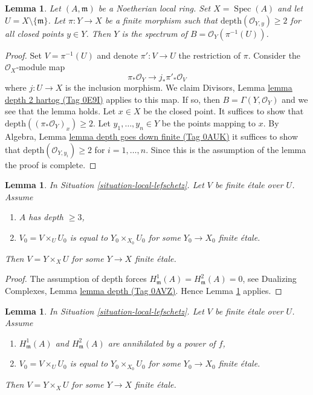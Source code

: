 \documentclass{amsart}
\theoremstyle{plain}
\newtheorem{lemma}[subsection]{Lemma}
\theoremstyle{definition}
\theoremstyle{remark}
\numberwithin{equation}{subsection}
\def\Spec{\mathop{\mathrm{Spec}}}
\begin{document}
\begin{lemma}
\label{lemma-sections-over-punctured-spec}
Let $(A, \mathfrak m)$ be a Noetherian local ring. Set $X = \Spec(A)$
and let $U = X \setminus \{\mathfrak m\}$.
Let $\pi : Y \to X$ be a finite morphism such that
$\text{depth}(\mathcal{O}_{Y, y}) \geq 2$ for all closed points
$y \in Y$.
Then $Y$ is the spectrum of $B = \mathcal{O}_Y(\pi^{-1}(U))$.
\end{lemma}

\begin{proof}
Set $V = \pi^{-1}(U)$ and denote $\pi' : V \to U$ the restriction of $\pi$.
Consider the $\mathcal{O}_X$-module map
$$
\pi_*\mathcal{O}_Y \longrightarrow j_*\pi'_*\mathcal{O}_V
$$
where $j : U \to X$ is the inclusion morphism. We claim
Divisors, Lemma \href{https://stacks.math.columbia.edu/tag/0E9I}{lemma depth 2 hartog (Tag 0E9I)}
applies to this map. If so, then $B = \Gamma(Y, \mathcal{O}_Y)$
and we see that the lemma holds. Let $x \in X$ be the closed point.
It suffices to show that
$\text{depth}((\pi_*\mathcal{O}_Y)_x) \geq 2$.
Let $y_1, \ldots, y_n \in Y$ be the points mapping to $x$.
By Algebra, Lemma \href{https://stacks.math.columbia.edu/tag/0AUK}{lemma depth goes down finite (Tag 0AUK)}
it suffices to show that
$\text{depth}(\mathcal{O}_{Y, y_i}) \geq 2$ for $i = 1, \ldots, n$.
Since this is the assumption of the lemma the proof is complete.
\end{proof}


\begin{lemma}
\label{lemma-lift-purity}
In Situation \ref{situation-local-lefschetz}.
Let $V$ be finite \'etale over $U$. Assume
\begin{enumerate}
\item $A$ has depth $\geq 3$,
\item $V_0 = V \times_U U_0$ is equal to $Y_0 \times_{X_0} U_0$
for some $Y_0 \to X_0$ finite \'etale.
\end{enumerate}
Then $V = Y \times_X U$ for some $Y \to X$ finite \'etale.
\end{lemma}

\begin{proof}
The assumption of depth forces
$H^1_\mathfrak m(A) = H^2_\mathfrak m(A) = 0$, see
Dualizing Complexes, Lemma \href{https://stacks.math.columbia.edu/tag/0AVZ}{lemma depth (Tag 0AVZ)}.
Hence Lemma \ref{lemma-lift-purity-general} applies.
\end{proof}


\begin{lemma}
\label{lemma-lift-purity-general}
In Situation \ref{situation-local-lefschetz}.
Let $V$ be finite \'etale over $U$. Assume
\begin{enumerate}
\item $H^1_\mathfrak m(A)$ and $H^2_\mathfrak m(A)$
are annihilated by a power of $f$,
\item $V_0 = V \times_U U_0$ is equal to $Y_0 \times_{X_0} U_0$
for some $Y_0 \to X_0$ finite \'etale.
\end{enumerate}
Then $V = Y \times_X U$ for some $Y \to X$ finite \'etale.
\end{lemma}
\end{document}
